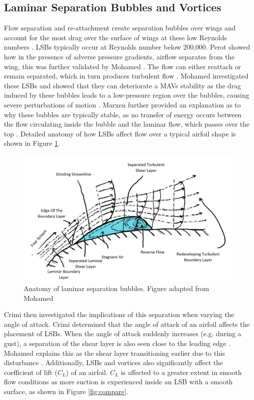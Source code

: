 \subsection{Laminar Separation Bubbles and Vortices}
Flow separation and re-attachment create separation bubbles over wings and account for the most drag over the surface of wings at these low Reynolds numbers \cite{ravi}. LSBs typically occur at Reynolds number below 200,000. Perot showed how in the presence of adverse pressure gradients, airflow separates from the wing, this was further validated by Mohamed \cite{Mohamed2014} \cite{Perot1999}. The flow can either reattach or remain separated, which in turn produces turbulent flow \cite{stability}. Mohamed investigated these LSBs and showed that they can deteriorate a MAVs stability as the drag induced by these bubbles leads to a low-pressure region over the bubbles, causing severe perturbations of motion \cite{Mohamed2014}. Marxen further provided an explanation as to why these bubbles are typically stable, as no transfer of energy occurs between the flow circulating inside the bubble and the laminar flow, which passes over the top \cite{Marxen2010}. Detailed anatomy of how LSBs affect flow over a typical airfoil shape is shown in Figure \ref{fig:Laminar}.


\begin{figure}[H]
  \centering
   \includegraphics[width=\linewidth]{03_LiteratureReview/Figs/LSB.jpg}
  \caption{Anatomy of laminar separation bubbles. Figure adapted from Mohamed \cite{Mohamed2014}}
  \label{fig:Laminar}
\end{figure}

Crimi then investigated the implications of this separation when varying the angle of attack. Crimi determined that the angle of attack of an airfoil affects the placement of LSBs. When the angle of attack suddenly increases (e.g. during a gust), a separation of the shear layer is also seen close to the leading edge \cite{Crimi1976}. Mohamed explains this as the shear layer transitioning earlier due to this disturbance  \cite{Mohamed2014}. Additionally, LSBs and vortices also significantly affect the coefficient of lift ($C_L$) of an airfoil. $C_L$ is affected to a greater extent in smooth flow conditions as more suction is experienced inside an LSB with a smooth surface, as shown in Figure \ref{fig:compare}. 


